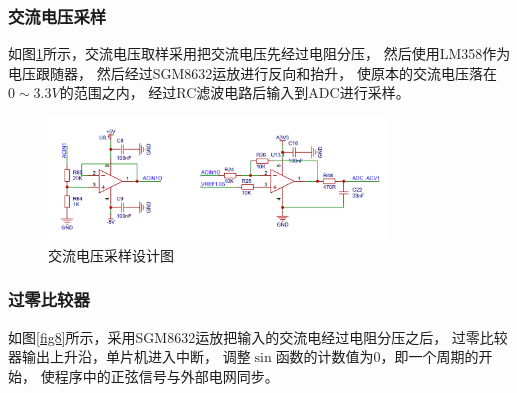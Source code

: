 \documentclass[a4paper,12pt]{article}
\begin{document}
\subsubsection{交流电压采样}
如图\ref{fig5}所示，交流电压取样采用把交流电压先经过电阻分压，
然后使用LM358作为电压跟随器，
然后经过SGM8632运放进行反向和抬升，
使原本的交流电压落在$0\sim 3.3V$的范围之内，
经过RC滤波电路后输入到ADC进行采样。
\begin{figure}[H]
\centering
\includegraphics[width=0.8\textwidth]{src/fig5.png}
\caption{交流电压采样设计图}
\label{fig5}
\end{figure}

\subsubsection{过零比较器}
如图\ref{fig8}所示，采用SGM8632运放把输入的交流电经过电阻分压之后，
过零比较器输出上升沿，单片机进入中断，
调整$\sin$函数的计数值为0，即一个周期的开始，
使程序中的正弦信号与外部电网同步。
\end{document}
